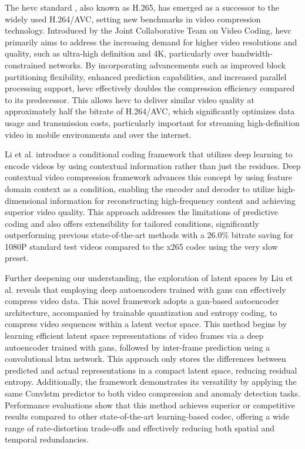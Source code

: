 The \gls{hevc} standard \cite{h265_2012}, also known as H.265, has emerged as a successor to the widely used H.264/AVC, setting new benchmarks in video compression technology. Introduced by the Joint Collaborative Team on Video Coding, \gls{hevc} primarily aims to address the increasing demand for higher video resolutions and quality, such as ultra-high definition and 4K, particularly over bandwidth-constrained networks. By incorporating advancements such as improved block partitioning flexibility, enhanced prediction capabilities, and increased parallel processing support, \gls{hevc} effectively doubles the compression efficiency compared to its predecessor. This allows \gls{hevc} to deliver similar video quality at approximately half the bitrate of H.264/AVC, which significantly optimizes data usage and transmission costs, particularly important for streaming high-definition video in mobile environments and over the internet.

Li et al. \cite{li2021deep} introduce a conditional coding framework that utilizes deep learning to encode videos by using contextual information rather than just the residues. Deep contextual video compression framework advances this concept by using feature domain context as a condition, enabling the encoder and decoder to utilize high-dimensional information for reconstructing high-frequency content and achieving superior video quality. This approach addresses the limitations of predictive coding and also offers extensibility for tailored conditions, significantly outperforming previous state-of-the-art methods with a 26.0\% bitrate saving for 1080P standard test videos compared to the x265 \gls{codec} using the very slow preset.

Further deepening our understanding, the exploration of latent spaces by Liu et al. \cite{Liu_latentvideo} reveals that employing deep autoencoders trained with \gls{gan}s can effectively compress video data. This novel framework adopts a \gls{gan}-based autoencoder architecture, accompanied by trainable quantization and entropy coding, to compress video sequences within a latent vector space. This method begins by learning efficient latent space representations of video frames via a deep autoencoder trained with \gls{gan}s, followed by inter-frame prediction using a convolutional \gls{lstm} network. This approach only stores the differences between predicted and actual representations in a compact latent space, reducing residual entropy. Additionally, the framework demonstrates its versatility by applying the same Conv\gls{lstm} predictor to both video compression and anomaly detection tasks. Performance evaluations show that this method achieves superior or competitive results compared to other state-of-the-art learning-based \gls{codec}, offering a wide range of rate-distortion trade-offs and effectively reducing both spatial and temporal redundancies.

